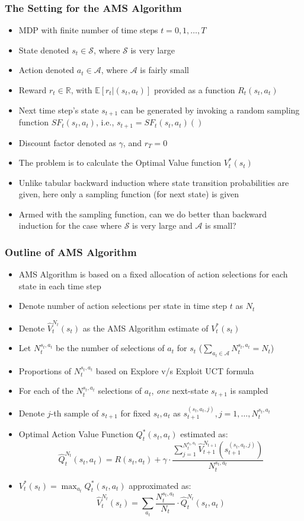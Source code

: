 \documentclass[handout]{beamer}
\begin{document}
\begin{frame}
\frametitle{The Setting for the AMS Algorithm}
\pause
\begin{itemize}[<+->]
\item MDP with finite number of time steps $t=0, 1, \ldots, T$
\item State denoted $s_t \in \mathcal{S}$, where $\mathcal{S}$ is very large
\item Action denoted $a_t \in \mathcal{A}$, where $\mathcal{A}$ is fairly small
\item Reward $r_t \in \mathbb{R}$, with $\mathbb{E}[r_t|(s_t, a_t)]$ provided as a function $R_t(s_t,a_t)$
\item Next time step's state $s_{t+1}$ can be generated by invoking a random sampling function $SF_t(s_t,a_t)$, i.e., $s_{t+1} = SF_t(s_t, a_t)()$
\item Discount factor denoted as $\gamma$, and $r_T = 0$
\item The problem is to calculate the Optimal Value function $V_t^*(s_t)$
\item Unlike tabular backward induction where state transition probabilities are given, here only a sampling function (for next state) is given
\item Armed with the sampling function, can we do better than backward induction for the case where $\mathcal{S}$ is very large and $\mathcal{A}$ is small?
\end{itemize}
\end{frame}

\begin{frame}
\frametitle{Outline of AMS Algorithm}
\pause
\begin{itemize}[<+->]
\item AMS Algorithm is based on a fixed allocation of action selections for each state in each time step
\item Denote number of action selections per state in time step $t$ as $N_t$
\item Denote $\hat{V}_t^{N_t}(s_t)$ as the AMS Algorithm estimate of $V_t^*(s_t)$
\item Let $N_t^{s_t,a_t}$ be the number of selections of $a_t$ for $s_t$ ($\sum_{a_t \in \mathcal{A}} N_t^{s_t,a_t} = N_t$)
\item Proportions of $N_t^{s_t,a_t}$ based on {Explore v/s Exploit} UCT formula
\item For each of the $N_t^{s_t,a_t}$ selections of $a_t$, {\em one} next-state $s_{t+1}$ is sampled
\item Denote $j$-th sample of $s_{t+1}$ for fixed $s_t,a_t$ as $s_{t+1}^{(s_t,a_t,j)}, j = 1, \ldots, N_t^{s_t,a_t}$
\item Optimal Action Value Function $Q_t^*(s_t, a_t)$ estimated as:
$$\hat{Q}_t^{N_t}(s_t,a_t) = R(s_t,a_t) + \gamma \cdot \frac {\sum_{j=1}^{N_t^{s_t,a_t}} \hat{V}_{t+1}^{N_{t+1}}(s_{t+1}^{(s_t,a_t,j)})} {N_t^{s_t,a_t}}$$
\item $V_t^*(s_t) = \max_{a_t} Q_t^*(s_t,a_t)$ approximated as:
$$\hat{V}_t^{N_t}(s_t) = \sum_{a_t} \frac {N_t^{s_t,a_t}} {N_t} \cdot \hat{Q}_t^{N_t}(s_t,a_t)$$
\end{itemize}
\end{frame}
\end{document}
